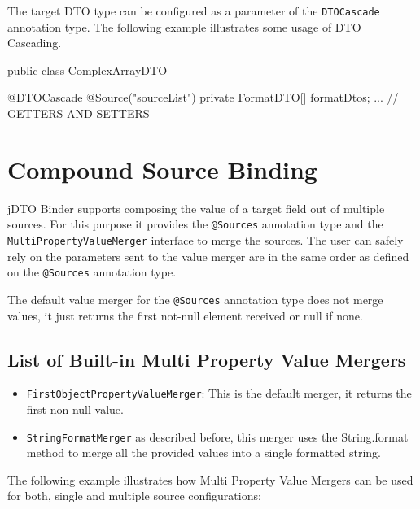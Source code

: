 \documentclass[11pt]{article}
\newcommand{\JDTO}{jDTO Binder\xspace}
\begin{document}
The target DTO type can be configured as a parameter of the \texttt{DTOCascade} annotation type. The following example illustrates some usage of DTO Cascading.


\begin{java}
 public class ComplexArrayDTO {
    
    @DTOCascade
    @Source("sourceList")
    private FormatDTO[] formatDtos;
    ... // GETTERS AND SETTERS
}
\end{java}

\section{Compound Source Binding}

\JDTO supports composing the value of a target field out of multiple sources. For this purpose it provides the \texttt{@Sources} annotation type and the \texttt{MultiPropertyValueMerger} interface to merge the sources.
The user can safely rely on the parameters sent to the value merger are in the same order as defined on the \texttt{@Sources} annotation type.

The default value merger for the \texttt{@Sources} annotation type does not merge values, it just returns the first not-null element received or null if none.

\subsection{List of Built-in Multi Property Value Mergers}

\begin{itemize}
 \item \texttt{FirstObjectPropertyValueMerger}: This is the default merger, it returns the first non-null value.
 \item \texttt{StringFormatMerger} as described before, this merger uses the String.format method to merge all the provided values into a single formatted string.
\end{itemize}


The following example illustrates how Multi Property Value Mergers can be used for both, single and multiple source configurations:


\end{document}
